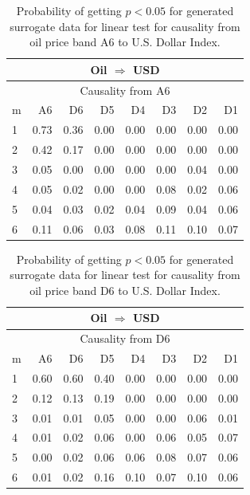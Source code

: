 %
%
\begin{table}[H]
\begin{center}
\begin{tabular}{l|r r r r r r r}
\hline\hline
\multicolumn{8}{c}{Oil $\Rightarrow$ USD}\\
\hline
\multicolumn{8}{c}{Causality from A6}\\
\hline\hline
m & A6 & D6 & D5 & D4 & D3 & D2 & D1 \\
\hline
1 & 0.73 & 0.36 & 0.00 & 0.00 & 0.00 & 0.00 & 0.00 \\
2 & 0.42 & 0.17 & 0.00 & 0.00 & 0.00 & 0.00 & 0.00 \\
3 & 0.05 & 0.00 & 0.00 & 0.00 & 0.00 & 0.04 & 0.00 \\
4 & 0.05 & 0.02 & 0.00 & 0.00 & 0.08 & 0.02 & 0.06 \\
5 & 0.04 & 0.03 & 0.02 & 0.04 & 0.09 & 0.04 & 0.06 \\
6 & 0.11 & 0.06 & 0.03 & 0.08 & 0.11 & 0.10 & 0.07 \\
\hline\hline
\end{tabular}
\caption{Probability of getting $p < 0.05$ for generated surrogate data for linear test for causality from oil price band A6 to U.S. Dollar Index.}
\end{center}
\end{table}

%
%
\begin{table}[H]
\begin{center}
\begin{tabular}{l|r r r r r r r}
\hline\hline
\multicolumn{8}{c}{Oil $\Rightarrow$ USD}\\
\hline
\multicolumn{8}{c}{Causality from D6}\\
\hline\hline
m & A6 & D6 & D5 & D4 & D3 & D2 & D1 \\
\hline
1 & 0.60 & 0.60 & 0.40 & 0.00 & 0.00 & 0.00 & 0.00 \\
2 & 0.12 & 0.13 & 0.19 & 0.00 & 0.00 & 0.00 & 0.00 \\
3 & 0.01 & 0.01 & 0.05 & 0.00 & 0.00 & 0.06 & 0.01 \\
4 & 0.01 & 0.02 & 0.06 & 0.00 & 0.06 & 0.05 & 0.07 \\
5 & 0.00 & 0.02 & 0.06 & 0.06 & 0.08 & 0.07 & 0.06 \\
6 & 0.01 & 0.02 & 0.16 & 0.10 & 0.07 & 0.10 & 0.06 \\
\hline\hline
\end{tabular}
\caption{Probability of getting $p < 0.05$ for generated surrogate data for linear test for causality from oil price band D6 to U.S. Dollar Index.}
\end{center}
\end{table}

